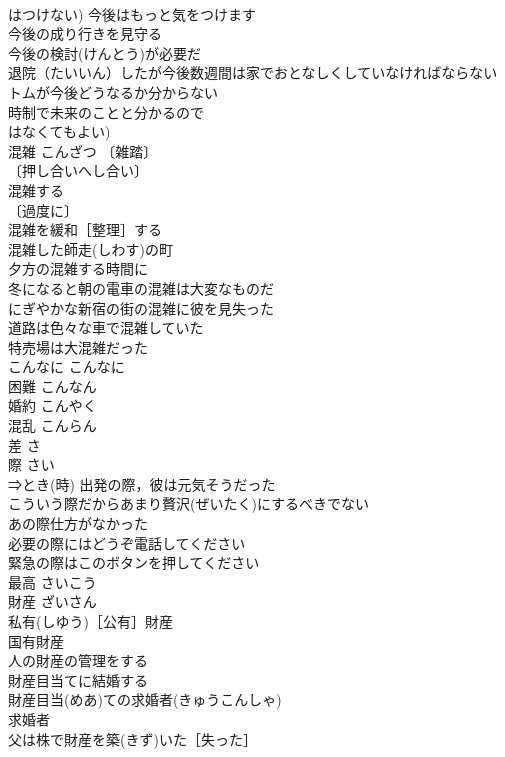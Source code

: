 \documentclass[8pt]{extreport}
\begin{document}
\begin{CJK}{UTF8}{min}
\\	はつけない) 今後はもっと気をつけます 
\\	今後の成り行きを見守る 
\\	今後の検討(けんとう)が必要だ 
\\	退院（たいいん）したが今後数週間は家でおとなしくしていなければならない 
\\	トムが今後どうなるか分からない 
\\	時制で未来のことと分かるので
\\	はなくてもよい)
\\	混雑	こんざつ	〔雑踏〕
\\	〔押し合いへし合い〕
\\	混雑する 
\\	〔過度に〕
\\	混雑を緩和［整理］する 
\\	混雑した師走(しわす)の町 
\\	夕方の混雑する時間に 
\\	冬になると朝の電車の混雑は大変なものだ 
\\	にぎやかな新宿の街の混雑に彼を見失った 
\\	道路は色々な車で混雑していた 
\\	特売場は大混雑だった 
\\	こんなに	こんなに	
\\	困難	こんなん	
\\	婚約	こんやく	
\\	混乱	こんらん	
\\	差	さ	
\\	際	さい	
\\	⇒とき(時) 出発の際，彼は元気そうだった 
\\	こういう際だからあまり贅沢(ぜいたく)にするべきでない 
\\	あの際仕方がなかった 
\\	必要の際にはどうぞ電話してください 
\\	緊急の際はこのボタンを押してください 
\\	最高	さいこう	
\\	財産	ざいさん	
\\	私有(しゆう)［公有］財産 
\\	国有財産 
\\	人の財産の管理をする 
\\	財産目当てに結婚する 
\\	財産目当(めあ)ての求婚者(きゅうこんしゃ) 
\\	求婚者　
\\	父は株で財産を築(きず)いた［失った］ 

\end{CJK}
\end{document}
